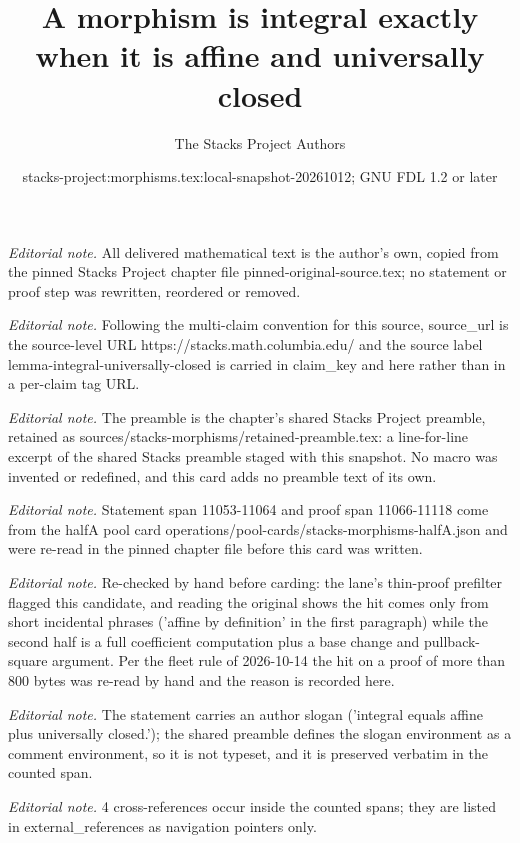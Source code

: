\documentclass[10pt,a4paper]{amsart}
\title{A morphism is integral exactly when it is affine and universally closed}
\author{The Stacks Project Authors}
\date{stacks-project:morphisms.tex:local-snapshot-20261012; GNU FDL 1.2 or later}
\theoremstyle{plain}
\theoremstyle{definition}
\theoremstyle{remark}
\numberwithin{equation}{subsection}
\begin{document}
\maketitle
\noindent\textit{Editorial note.} All delivered mathematical text is the author's own, copied from the pinned Stacks Project chapter file pinned-original-source.tex; no statement or proof step was rewritten, reordered or removed.\par\medskip
\noindent\textit{Editorial note.} Following the multi-claim convention for this source, source\_url is the source-level URL https://stacks.math.columbia.edu/ and the source label lemma-integral-universally-closed is carried in claim\_key and here rather than in a per-claim tag URL.\par\medskip
\noindent\textit{Editorial note.} The preamble is the chapter's shared Stacks Project preamble, retained as sources/stacks-morphisms/retained-preamble.tex: a line-for-line excerpt of the shared Stacks preamble staged with this snapshot. No macro was invented or redefined, and this card adds no preamble text of its own.\par\medskip
\noindent\textit{Editorial note.} Statement span 11053-11064 and proof span 11066-11118 come from the halfA pool card operations/pool-cards/stacks-morphisms-halfA.json and were re-read in the pinned chapter file before this card was written.\par\medskip
\noindent\textit{Editorial note.} Re-checked by hand before carding: the lane's thin-proof prefilter flagged this candidate, and reading the original shows the hit comes only from short incidental phrases ('affine by definition' in the first paragraph) while the second half is a full coefficient computation plus a base change and pullback-square argument. Per the fleet rule of 2026-10-14 the hit on a proof of more than 800 bytes was re-read by hand and the reason is recorded here.\par\medskip
\noindent\textit{Editorial note.} The statement carries an author slogan ('integral equals affine plus universally closed.'); the shared preamble defines the slogan environment as a comment environment, so it is not typeset, and it is preserved verbatim in the counted span.\par\medskip
\noindent\textit{Editorial note.} 4 cross-references occur inside the counted spans; they are listed in external\_references as navigation pointers only.\par\medskip
\end{document}

